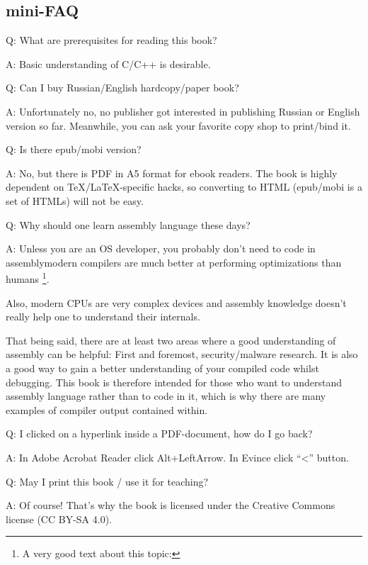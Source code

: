 \subsection*{mini-FAQ}

\par Q: What are prerequisites for reading this book?
\par A: Basic understanding of C/C++ is desirable.

\par Q: Can I buy Russian/English hardcopy/paper book?
\par A: Unfortunately no, no publisher got interested in publishing Russian or English version so far.
Meanwhile, you can ask your favorite copy shop to print/bind it.

\par Q: Is there epub/mobi version?
\par A: No, but there is PDF in A5 format for ebook readers.
The book is highly dependent on TeX/LaTeX-specific hacks, so converting to HTML (epub/mobi is a set of HTMLs)
will not be easy.

\par Q: Why should one learn assembly language these days?
\par A: Unless you are an \ac{OS} developer, you probably don't need to code in assembly\textemdash{}modern compilers 
are much better at performing optimizations than humans \footnote{A very good text about this topic: \InSqBrackets{\AgnerFog}}.

Also, modern \ac{CPU}s are very complex devices and assembly knowledge doesn't really help one to understand their internals.

That being said, there are at least two areas where a good understanding of assembly can be helpful: 
First and foremost, security/malware research. It is also a good way to gain a better understanding of your compiled code whilst debugging.
This book is therefore intended for those who want to understand assembly language rather 
than to code in it, which is why there are many examples of compiler output contained within.

\par Q: I clicked on a hyperlink inside a PDF-document, how do I go back?
\par A: In Adobe Acrobat Reader click Alt+LeftArrow. In Evince click ``<'' button.

\par Q: May I print this book / use it for teaching?
\par A: Of course! That's why the book is licensed under the Creative Commons license (CC BY-SA 4.0).

